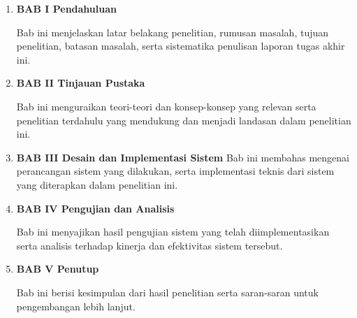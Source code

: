 \begin{enumerate}[nolistsep]
  \item \textbf{BAB I Pendahuluan}

        Bab ini menjelaskan latar belakang penelitian, rumusan masalah, tujuan penelitian, batasan masalah, serta sistematika penulisan laporan tugas akhir ini.

        \vspace{2ex}

  \item \textbf{BAB II Tinjauan Pustaka}

        Bab ini menguraikan teori-teori dan konsep-konsep yang relevan serta penelitian terdahulu yang mendukung dan menjadi landasan dalam penelitian ini.

        \vspace{2ex}

  \item \textbf{BAB III Desain dan Implementasi Sistem}
        Bab ini membahas mengenai perancangan sistem yang dilakukan, serta implementasi teknis dari sistem yang diterapkan dalam penelitian ini.

        \vspace{2ex}

  \item \textbf{BAB IV Pengujian dan Analisis}

        Bab ini menyajikan hasil pengujian sistem yang telah diimplementasikan serta analisis terhadap kinerja dan efektivitas sistem tersebut.

        \vspace{2ex}

  \item \textbf{BAB V Penutup}

        Bab ini berisi kesimpulan dari hasil penelitian serta saran-saran untuk pengembangan lebih lanjut.

\end{enumerate}
